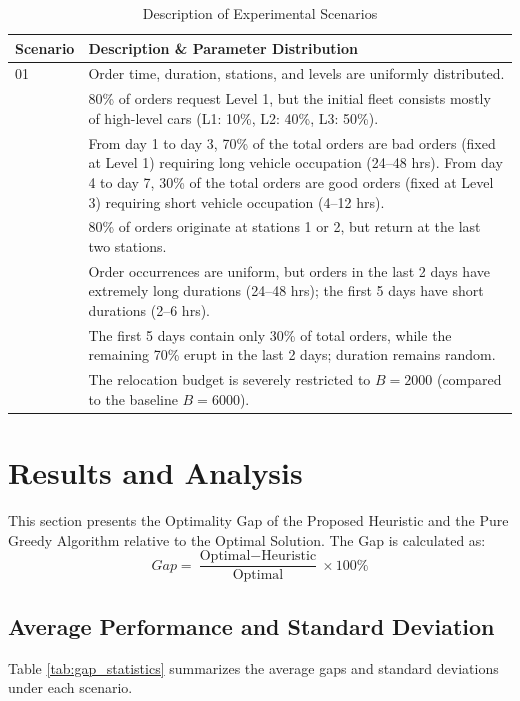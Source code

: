 \documentclass[12pt, a4paper]{article}
\begin{document}
\begin{table}[H]
    \centering
    \caption{Description of Experimental Scenarios}
    \label{tab:scenarios}
    \small
    \begin{tabularx}{\textwidth}{@{}l X@{}}
        \toprule
        \textbf{Scenario} & \textbf{Description \& Parameter Distribution} \\
        \midrule
        01 & Order time, duration, stations, and levels are uniformly distributed. \\
        \addlinespace
        02 & 80\% of orders request Level 1, but the initial fleet consists mostly of high-level cars (L1: 10\%, L2: 40\%, L3: 50\%). \\
        \addlinespace
        03 & From day 1 to day 3, 70\% of the total orders are bad orders (fixed at Level 1) requiring long vehicle occupation (24--48 hrs). From day 4 to day 7, 30\% of the total orders are good orders (fixed at Level 3) requiring short vehicle occupation (4--12 hrs). \\
        \addlinespace
        04 & 80\% of orders originate at stations 1 or 2, but return at the last two stations. \\
        \addlinespace
        05 & Order occurrences are uniform, but orders in the last 2 days have extremely long durations (24--48 hrs); the first 5 days have short durations (2--6 hrs). \\
        \addlinespace
        06 & The first 5 days contain only 30\% of total orders, while the remaining 70\% erupt in the last 2 days; duration remains random. \\
        \addlinespace
        07 & The relocation budget is severely restricted to $B = 2000$ (compared to the baseline $B = 6000$). \\
        \bottomrule
    \end{tabularx}
\end{table}

\section{Results and Analysis}
This section presents the Optimality Gap of the Proposed Heuristic and the Pure Greedy Algorithm relative to the Optimal Solution. The Gap is calculated as:
\begin{equation}
    Gap = \frac{\text{Optimal} - \text{Heuristic}}{\text{Optimal}} \times 100\%
\end{equation}

\subsection{Average Performance and Standard Deviation}
Table \ref{tab:gap_statistics} summarizes the average gaps and standard deviations under each scenario.
\end{document}
